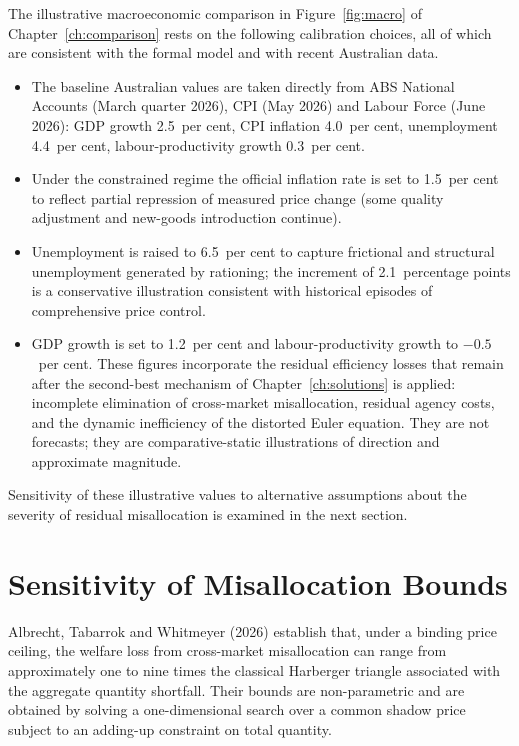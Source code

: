 \documentclass[12pt,anyside]{book}
\theoremstyle{definition}
\theoremstyle{plain}
\theoremstyle{remark}
\begin{document}
The illustrative macroeconomic comparison in Figure~\ref{fig:macro} of Chapter~\ref{ch:comparison} rests on the following calibration choices, all of which are consistent with the formal model and with recent Australian data.

\begin{itemize}
\item The baseline Australian values are taken directly from ABS National Accounts (March quarter 2026), CPI (May 2026) and Labour Force (June 2026): GDP growth 2.5~per cent, CPI inflation 4.0~per cent, unemployment 4.4~per cent, labour-productivity growth 0.3~per cent.

\item Under the constrained regime the official inflation rate is set to 1.5~per cent to reflect partial repression of measured price change (some quality adjustment and new-goods introduction continue). 

\item Unemployment is raised to 6.5~per cent to capture frictional and structural unemployment generated by rationing; the increment of 2.1~percentage points is a conservative illustration consistent with historical episodes of comprehensive price control.

\item GDP growth is set to 1.2~per cent and labour-productivity growth to $-0.5$~per cent. These figures incorporate the residual efficiency losses that remain after the second-best mechanism of Chapter~\ref{ch:solutions} is applied: incomplete elimination of cross-market misallocation, residual agency costs, and the dynamic inefficiency of the distorted Euler equation. They are not forecasts; they are comparative-static illustrations of direction and approximate magnitude.
\end{itemize}

Sensitivity of these illustrative values to alternative assumptions about the severity of residual misallocation is examined in the next section.

\section{Sensitivity of Misallocation Bounds}

Albrecht, Tabarrok and Whitmeyer (2026) establish that, under a binding price ceiling, the welfare loss from cross-market misallocation can range from approximately one to nine times the classical Harberger triangle associated with the aggregate quantity shortfall. Their bounds are non-parametric and are obtained by solving a one-dimensional search over a common shadow price subject to an adding-up constraint on total quantity.
\end{document}
